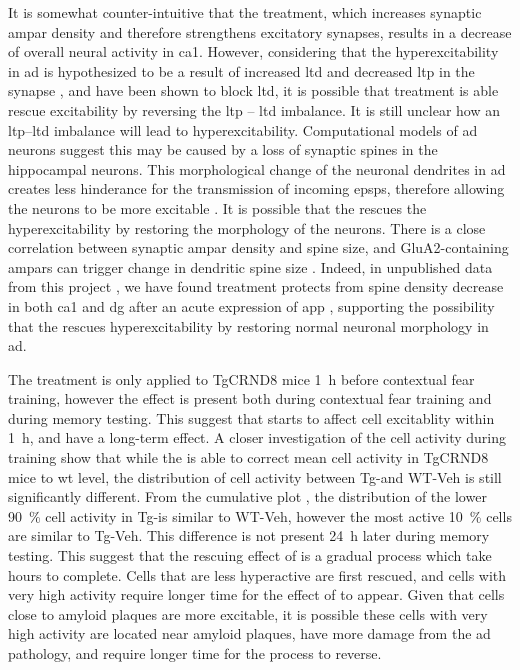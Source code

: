 It is somewhat counter-intuitive that the \tglu{} treatment, which increases synaptic \gls{ampar} density and therefore strengthens excitatory synapses, results in a decrease of overall neural activity in \gls{ca1}. However, considering that the hyperexcitability in \gls{ad} is hypothesized to be a result of increased \gls{ltd} and decreased \gls{ltp} in the synapse , and \tglu{} have been shown to block \gls{ltd}, it is possible that \tglu treatment is able rescue excitability by reversing the \gls{ltp} -- \gls{ltd} imbalance. It is still unclear how an \gls{ltp}--\gls{ltd} imbalance will lead to hyperexcitability. Computational models of \gls{ad} neurons suggest this may be caused by a loss of synaptic spines in the hippocampal neurons. This morphological change of the neuronal dendrites in \gls{ad} creates less hinderance for the transmission of incoming \glspl{epsp}, therefore allowing the neurons to be more excitable \citep{siskova14}. It is possible that the \tglu{} rescues the hyperexcitability by restoring the morphology of the neurons. There is a close correlation between synaptic \gls{ampar} density and spine size, and GluA2-containing \glspl{ampar} can trigger change in dendritic spine size \citep{hanley08}. Indeed, in unpublished data from this project , we have found \tglu{} treatment protects from spine density decrease in both \gls{ca1} and \gls{dg} after an acute expression of \gls{app} , supporting the possibility that the \tglu{ } rescues hyperexcitability by restoring normal neuronal morphology in \gls{ad}. 

The \tglu{} treatment is only applied to TgCRND8 mice \SI{1}{\hour} before contextual fear training, however the effect \tglu{} is present both during contextual fear training and during memory testing. This suggest that \tglu{}
starts to affect cell excitablity within \SI{1}{\hour}, and have a long-term effect. A closer investigation of the cell activity during training show that while the \tglu{} is able to correct mean cell activity in TgCRND8 mice to \gls{wt} level, the distribution of cell activity between Tg-\tglu and WT-Veh is still significantly different. From the cumulative plot , the distribution of the lower \SI{90}{\percent} cell activity in Tg-\tglu is similar to WT-Veh, however the most active \SI{10}{\percent} cells are similar to Tg-Veh. This difference is not present \SI{24}{\hour} later during memory testing. This suggest that the rescuing effect of \tglu{} is a gradual process which take hours to complete. Cells that are less hyperactive are first rescued, and cells with very high activity require longer time for the effect of \tglu{} to appear. Given that cells close to amyloid plaques are more excitable\citep{busche12}, it is possible these cells with very high activity are located near amyloid plaques, have more damage from the \gls{ad} pathology, and require longer time for the process to reverse. 




